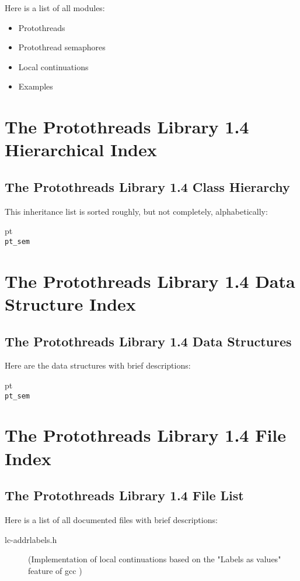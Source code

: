 \documentclass[12pt]{article}
\begin{document}
\begin{CJK}{UTF8}{bsmi}
Here is a list of all modules:

\begin{itemize}
\item Protothreads 
\item Protothread semaphores 
\item Local continuations
\item Examples 
\end{itemize}

\section{The Protothreads Library 1.4 Hierarchical Index}

\subsection{The Protothreads Library 1.4 Class Hierarchy}

This inheritance list is sorted roughly, but not completely, alphabetically:

pt \\
\verb+pt_sem+

\section{The Protothreads Library 1.4 Data Structure Index}
\subsection{The Protothreads Library 1.4 Data Structures}

Here are the data structures with brief descriptions:

pt\\
\verb+pt_sem+

\section{The Protothreads Library 1.4 File Index}

\subsection{The Protothreads Library 1.4 File List}

Here is a list of all documented files with brief descriptions:

\begin{description} 
\item [lc-addrlabels.h] (Implementation of local continuations based on the "Labels as values" feature of gcc ) 


\end{description}
\end{CJK}
\end{document}
